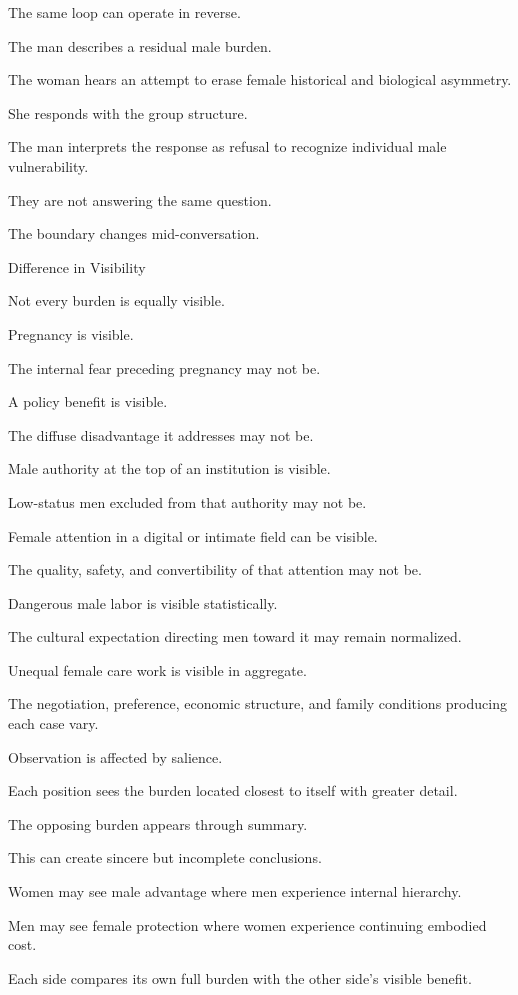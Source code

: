 The same loop can operate in reverse.

The man describes a residual male burden.

The woman hears an attempt to erase female historical and biological asymmetry.

She responds with the group structure.

The man interprets the response as refusal to recognize individual male vulnerability.

They are not answering the same question.

The boundary changes mid-conversation.

Difference in Visibility

Not every burden is equally visible.

Pregnancy is visible.

The internal fear preceding pregnancy may not be.

A policy benefit is visible.

The diffuse disadvantage it addresses may not be.

Male authority at the top of an institution is visible.

Low-status men excluded from that authority may not be.

Female attention in a digital or intimate field can be visible.

The quality, safety, and convertibility of that attention may not be.

Dangerous male labor is visible statistically.

The cultural expectation directing men toward it may remain normalized.

Unequal female care work is visible in aggregate.

The negotiation, preference, economic structure, and family conditions producing each case vary.

Observation is affected by salience.

Each position sees the burden located closest to itself with greater detail.

The opposing burden appears through summary.

This can create sincere but incomplete conclusions.

Women may see male advantage where men experience internal hierarchy.

Men may see female protection where women experience continuing embodied cost.

Each side compares its own full burden with the other side’s visible benefit.

